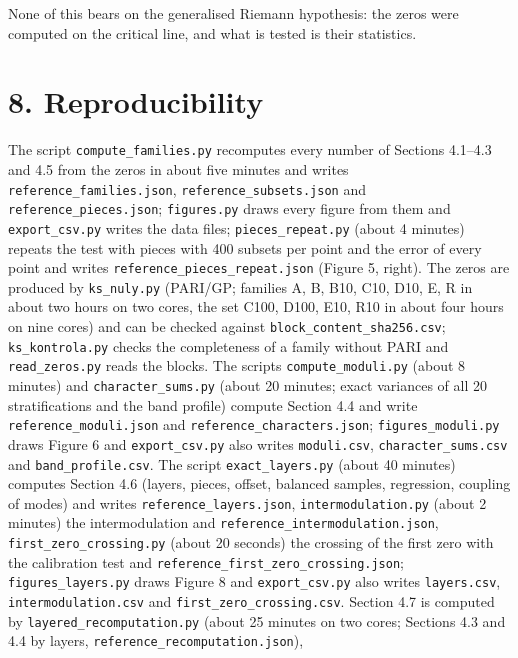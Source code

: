 \documentclass[
  10pt,
]{article}
\begin{document}
None of this bears on the generalised Riemann hypothesis: the zeros were
computed on the critical line, and what is tested is their statistics.

\hypertarget{reproducibility}{%
\section{8. Reproducibility}\label{reproducibility}}

The script \texttt{compute\_families.py} recomputes every number of
Sections 4.1--4.3 and 4.5 from the zeros in about five minutes and
writes \texttt{reference\_families.json},
\texttt{reference\_subsets.json} and \texttt{reference\_pieces.json};
\texttt{figures.py} draws every figure from them and
\texttt{export\_csv.py} writes the data files;
\texttt{pieces\_repeat.py} (about 4 minutes) repeats the test with
pieces with 400 subsets per point and the error of every point and
writes \texttt{reference\_pieces\_repeat.json} (Figure 5, right). The
zeros are produced by \texttt{ks\_nuly.py} (PARI/GP; families A, B, B10,
C10, D10, E, R in about two hours on two cores, the set C100, D100, E10,
R10 in about four hours on nine cores) and can be checked against
\texttt{block\_content\_sha256.csv}; \texttt{ks\_kontrola.py} checks the
completeness of a family without PARI and \texttt{read\_zeros.py} reads
the blocks. The scripts \texttt{compute\_moduli.py} (about 8 minutes)
and \texttt{character\_sums.py} (about 20 minutes; exact variances of
all 20 stratifications and the band profile) compute Section 4.4 and
write \texttt{reference\_moduli.json} and
\texttt{reference\_characters.json}; \texttt{figures\_moduli.py} draws
Figure 6 and \texttt{export\_csv.py} also writes \texttt{moduli.csv},
\texttt{character\_sums.csv} and \texttt{band\_profile.csv}. The script
\texttt{exact\_layers.py} (about 40 minutes) computes Section 4.6
(layers, pieces, offset, balanced samples, regression, coupling of
modes) and writes \texttt{reference\_layers.json},
\texttt{intermodulation.py} (about 2 minutes) the intermodulation and
\texttt{reference\_intermodulation.json},
\texttt{first\_zero\_crossing.py} (about 20 seconds) the crossing of the
first zero with the calibration test and
\texttt{reference\_first\_zero\_crossing.json};
\texttt{figures\_layers.py} draws Figure 8 and \texttt{export\_csv.py}
also writes \texttt{layers.csv}, \texttt{intermodulation.csv} and
\texttt{first\_zero\_crossing.csv}. Section 4.7 is computed by
\texttt{layered\_recomputation.py} (about 25 minutes on two cores;
Sections 4.3 and 4.4 by layers, \texttt{reference\_recomputation.json}),
\end{document}
